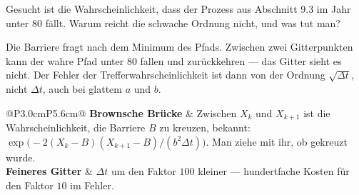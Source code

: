 \begin{aufgabe}
Gesucht ist die Wahrscheinlichkeit, dass der Prozess aus Abschnitt 9.3 im Jahr unter $80$ fällt. Warum reicht die schwache Ordnung nicht, und was tut man?

\loesung
{}
Die Barriere fragt nach dem Minimum des Pfads. Zwischen zwei Gitterpunkten kann der wahre Pfad unter $80$ fallen und zurückkehren --- das Gitter sieht es nicht. Der Fehler der Trefferwahrscheinlichkeit ist dann von der Ordnung $\sqrt{\Delta t}$, nicht $\Delta t$, auch bei glattem $a$ und $b$.

\begin{center}
{\small
\renewcommand{\arraystretch}{1.5}
\begin{tabular}{@{}P{3.0cm}P{5.6cm}@{}}
\toprule
\textbf{Brownsche Brücke} & Zwischen $X_k$ und $X_{k+1}$ ist die Wahrscheinlichkeit, die Barriere $B$ zu kreuzen, bekannt: $\exp\!\big(-2(X_k-B)(X_{k+1}-B)/(b^2\Delta t)\big)$. Man ziehe mit ihr, ob gekreuzt wurde.\\
\textbf{Feineres Gitter} & $\Delta t$ um den Faktor $100$ kleiner --- hundertfache Kosten für den Faktor $10$ im Fehler.\\
\bottomrule
\end{tabular}}
\end{center}

\begin{center}
\begin{minipage}{0.88\textwidth}
\end{minipage}
\end{center}
\end{aufgabe}

